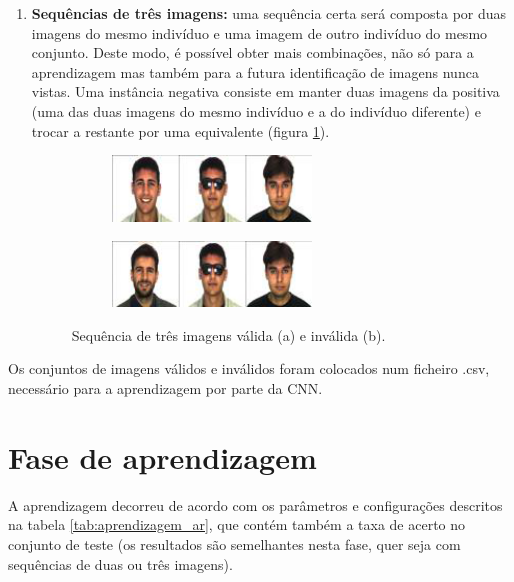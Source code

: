 \begin{enumerate}
    \item \textbf{Sequências de três imagens:} uma sequência certa será composta por duas imagens do mesmo indivíduo e uma imagem de outro indivíduo do mesmo conjunto. Deste modo, é possível obter mais combinações, não só para a aprendizagem mas também para a futura identificação de imagens nunca vistas.\newline
    \noindent Uma instância negativa consiste em manter duas imagens da positiva (uma das duas imagens do mesmo indivíduo e a do indivíduo diferente) e trocar a restante por uma equivalente (figura \ref{fig:trocas3}).
    
    \begin{figure}[h]
      \centering
      \begin{subfigure}{5.3cm}
        \centering\includegraphics[width=5.3cm]{sequencia_3_boa.png}
        \caption{}
      \end{subfigure}
      \hspace{1em}
      \begin{subfigure}{5.3cm}
        \centering\includegraphics[width=5.3cm]{sequencia_3_ma.png}
        \caption{}
      \end{subfigure}
      \caption{Sequência de três imagens válida (a) e inválida (b).}
      \label{fig:trocas3}
    \end{figure}
    
\end{enumerate}

\noindent Os conjuntos de imagens válidos e inválidos foram colocados num ficheiro .csv, necessário para a aprendizagem por parte da \ac{CNN}.

\section{Fase de aprendizagem}
\label{chap4:sec:aprendizagem}
A aprendizagem decorreu de acordo com os parâmetros e configurações descritos na tabela \ref{tab:aprendizagem_ar}, que contém também a taxa de acerto no conjunto de teste (os resultados são semelhantes nesta fase, quer seja com sequências de duas ou três imagens).

